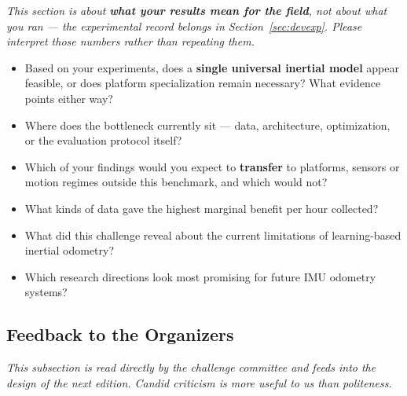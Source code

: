 \documentclass[letterpaper,10pt,conference]{ieeeconf}
\newcommand{\instruction}[1]{\textcolor{instructionblue}{\textit{#1}}}
\begin{document}
\instruction{
This section is about \textbf{what your results mean for the field}, not about what you ran
--- the experimental record belongs in Section~\ref{sec:devexp}. Please interpret those
numbers rather than repeating them.
}

\begin{itemize}
    \item Based on your experiments, does a \textbf{single universal inertial model} appear
    feasible, or does platform specialization remain necessary? What evidence points either way?
    \item Where does the bottleneck currently sit --- data, architecture, optimization, or the
    evaluation protocol itself?
    \item Which of your findings would you expect to \textbf{transfer} to platforms, sensors or
    motion regimes outside this benchmark, and which would not?
    \item What kinds of data gave the highest marginal benefit per hour collected?
    \item What did this challenge reveal about the current limitations of learning-based
    inertial odometry?
    \item Which research directions look most promising for future IMU odometry systems?
\end{itemize}


\subsection{Feedback to the Organizers}

\instruction{This subsection is read directly by the challenge committee and feeds into the
design of the next edition. Candid criticism is more useful to us than politeness.}
\end{document}
